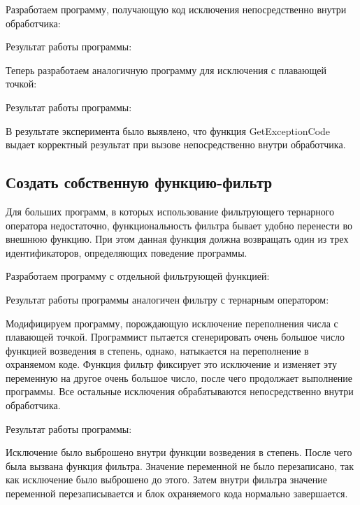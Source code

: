 \documentclass[14pt,a4paper,report]{report}
\begin{document}
Разработаем программу, получающую код исключения непосредственно внутри обработчика:



Результат работы программы:



Теперь разработаем аналогичную программу для исключения с плавающей точкой:



Результат работы программы:



В результате эксперимента было выявлено, что функция GetExceptionCode выдает корректный результат при вызове непосредственно внутри обработчика.

\subsection{Создать собственную функцию-фильтр}

Для больших программ, в которых использование фильтрующего тернарного оператора недостаточно, функциональность фильтра бывает удобно перенести во внешнюю функцию. При этом данная функция должна возвращать один из трех идентификаторов, определяющих поведение программы.

Разработаем программу с отдельной фильтрующей функцией:



Результат работы программы аналогичен фильтру с тернарным оператором:



Модифицируем программу, порождающую исключение переполнения числа с плавающей точкой. Программист пытается сгенерировать очень большое число функцией возведения в степень, однако, натыкается на переполнение в охраняемом коде. Функция фильтр фиксирует это исключение и изменяет эту переменную на другое очень большое число, после чего продолжает выполнение программы. Все остальные исключения обрабатываются непосредственно внутри обработчика.



Результат работы программы:



Исключение было выброшено внутри функции возведения в степень. После чего была вызвана функция фильтра. Значение переменной не было перезаписано, так как исключение было выброшено до этого. Затем внутри фильтра значение переменной перезаписывается и блок охраняемого кода нормально завершается.
\end{document}
